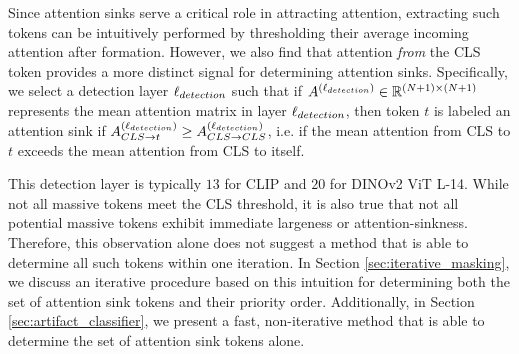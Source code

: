 Since attention sinks serve a critical role in attracting attention, extracting such tokens can be intuitively performed by thresholding their average incoming attention after formation. However, we also find that attention \textit{from} the CLS token provides a more distinct signal for determining attention sinks. Specifically, we select a detection layer $\ell_{detection}$ such that if $A^{(\ell_{detection})} \in \mathbb{R}^{(N + 1) \times (N + 1)}$ represents the mean attention matrix in layer $\ell_{detection}$, then token $t$ is labeled an attention sink if $A^{(\ell_{detection})}_{CLS \to t} \geq A^{(\ell_{detection})}_{CLS \to CLS}$, i.e. if the mean attention from CLS to $t$ exceeds the mean attention from CLS to itself.

This detection layer is typically $13$ for CLIP and $20$ for DINOv2 ViT L-14. While not all massive tokens meet the CLS threshold, it is also true that not all potential massive tokens exhibit immediate largeness or attention-sinkness. Therefore,  this observation alone does not suggest a method that is able to determine all such tokens within one iteration. In Section \ref{sec:iterative_masking}, we discuss an iterative procedure based on this intuition for determining both the set of attention sink tokens and their priority order. Additionally, in Section \ref{sec:artifact_classifier}, we present a fast, non-iterative method that is able to determine the set of attention sink tokens alone.






